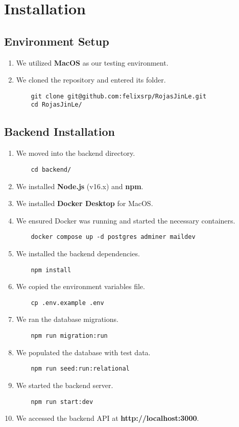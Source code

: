 \chapter{Installation}

\section{Environment Setup}
\begin{enumerate}
    \item We utilized \textbf{MacOS} as our testing environment.
    \item We cloned the repository and entered its folder.
    \begin{verbatim}
    git clone git@github.com:felixsrp/RojasJinLe.git
    cd RojasJinLe/
    \end{verbatim}
\end{enumerate}

\section{Backend Installation}
\begin{enumerate}
    \item We moved into the backend directory.
    \begin{verbatim}
    cd backend/
    \end{verbatim}
    \item We installed \textbf{Node.js} (v16.x) and \textbf{npm}.
    \item We installed \textbf{Docker Desktop} for MacOS.
    \item We ensured Docker was running and started the necessary containers.
    \begin{verbatim}
    docker compose up -d postgres adminer maildev
    \end{verbatim}
    \item We installed the backend dependencies.
    \begin{verbatim}
    npm install
    \end{verbatim}
    \item We copied the environment variables file.
    \begin{verbatim}
    cp .env.example .env
    \end{verbatim}
    \item We ran the database migrations.
    \begin{verbatim}
    npm run migration:run
    \end{verbatim}
    \item We populated the database with test data.
    \begin{verbatim}
    npm run seed:run:relational
    \end{verbatim}
    \item We started the backend server.
    \begin{verbatim}
    npm run start:dev
    \end{verbatim}
    \item We accessed the backend API at \textbf{http://localhost:3000}.
\end{enumerate}

